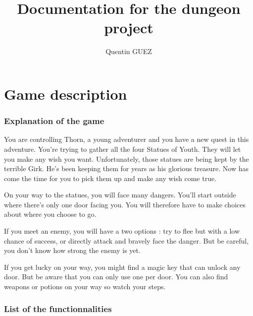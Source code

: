 \documentclass[11pt]{extarticle}
\title{\Huge{Documentation for the dungeon project}}
\author{Quentin GUEZ}
\date{}
\begin{document}
\maketitle

\tableofcontents

\clearpage

\part{Game description}

\section{Explanation of the game}

You are controlling Thorn, a young adventurer and you have a new quest in this adventure. You're trying to gather all the four Statues of Youth. They will let you make any wish you want. Unfortunately, those statues are being kept by the terrible Girk. He's been keeping them for years as his glorious treasure. Now has come the time for you to pick them up and make any wish come true.

On your way to the statues, you will face many dangers. You'll start outside where there's only one door facing you. You will therefore have to make choices about where you choose to go. 

If you meet an enemy, you will have a two options : try to flee but with a low chance of success, or directly attack and bravely face the danger. But be careful, you don't know how strong the enemy is yet. 

If you get lucky on your way, you might find a magic key that can unlock any door. But be aware that you can only use one per door. You can also find weapons or potions on your way so watch your steps.

\section{List of the functionnalities}
\end{document}
